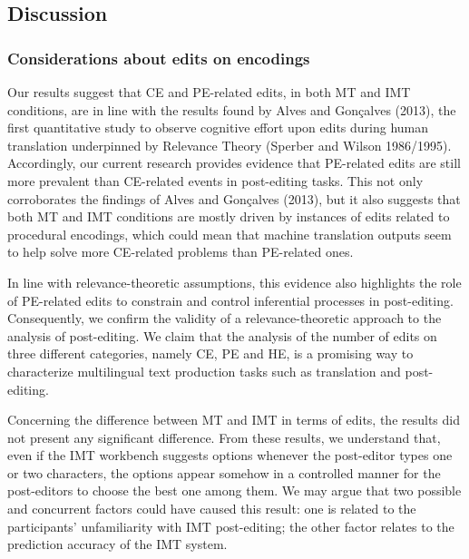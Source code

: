 \documentclass[output=paper]{langsci/langscibook}
\begin{document}
\subsection{Discussion}

\subsubsection{Considerations about edits on encodings}

Our results suggest that CE and PE-related edits, in both MT and IMT conditions, are in line with the results found by Alves and Gonçalves (2013), the first quantitative study to observe cognitive effort upon edits during human translation underpinned by Relevance Theory (Sperber and Wilson 1986/1995). Accordingly, our current research provides evidence that PE-related edits are still more prevalent than CE-related events in post-editing tasks. This not only corroborates the findings of Alves and Gonçalves (2013), but it also suggests that both MT and IMT conditions are mostly driven by instances of edits related to procedural encodings, which could mean that machine translation outputs seem to help solve more CE-related problems than PE-related ones.



In line with relevance-theoretic assumptions, this evidence also highlights the role of PE-related edits to constrain and control inferential processes in post-editing.  Consequently, we confirm the validity of a relevance-theoretic approach to the analysis of post-editing. We claim that the analysis of the number of edits on three different categories, namely CE, PE and HE, is a promising way to characterize multilingual text production tasks such as translation and post-editing.  



Concerning the difference between MT and IMT in terms of edits, the results did not present any significant difference.  From these results, we understand that, even if the IMT workbench suggests options whenever the post-editor types one or two characters, the options appear somehow in a controlled manner for the post-editors to choose the best one among them. We may argue that two possible and concurrent factors could have caused this result: one is related to the participants’ unfamiliarity with IMT post-editing; the other factor relates to the prediction accuracy of the IMT system.  
\end{document}
